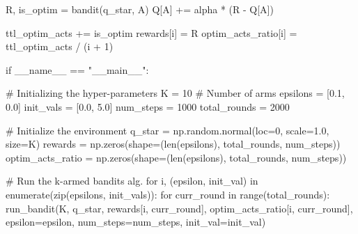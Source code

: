 \documentclass[
  letterpaper,
]{krantz}
\makeatletter
\newenvironment{Shaded}{\begin{snugshade}}{\end{snugshade}}
\newcommand{\BuiltInTok}[1]{\textcolor[rgb]{0.00,0.23,0.31}{#1}}
\newcommand{\CommentTok}[1]{\textcolor[rgb]{0.37,0.37,0.37}{#1}}
\newcommand{\ControlFlowTok}[1]{\textcolor[rgb]{0.00,0.23,0.31}{#1}}
\newcommand{\DecValTok}[1]{\textcolor[rgb]{0.68,0.00,0.00}{#1}}
\newcommand{\FloatTok}[1]{\textcolor[rgb]{0.68,0.00,0.00}{#1}}
\newcommand{\KeywordTok}[1]{\textcolor[rgb]{0.00,0.23,0.31}{#1}}
\newcommand{\NormalTok}[1]{\textcolor[rgb]{0.00,0.23,0.31}{#1}}
\newcommand{\OperatorTok}[1]{\textcolor[rgb]{0.37,0.37,0.37}{#1}}
\newcommand{\StringTok}[1]{\textcolor[rgb]{0.13,0.47,0.30}{#1}}
\newcommand{\VariableTok}[1]{\textcolor[rgb]{0.07,0.07,0.07}{#1}}
\newenvironment{kframe}{%
\medskip{}
\setlength{\fboxsep}{.8em}
 \def\at@end@of@kframe{}%
 \ifinner\ifhmode%
  \def\at@end@of@kframe{\end{minipage}}%
  \begin{minipage}{\columnwidth}%
 \fi\fi%
 \def\FrameCommand##1{\hskip\@totalleftmargin \hskip-\fboxsep
 \colorbox{shadecolor}{##1}\hskip-\fboxsep
     \hskip-\linewidth \hskip-\@totalleftmargin \hskip\columnwidth}%
 \MakeFramed {\advance\hsize-\width
   \@totalleftmargin\z@ \linewidth\hsize
   \@setminipage}}%
 {\par\unskip\endMakeFramed%
 \at@end@of@kframe}
\renewenvironment{Shaded}{\begin{kframe}}{\end{kframe}}
\theoremstyle{plain}
\theoremstyle{definition}
\theoremstyle{definition}
\theoremstyle{remark}
\makeatother
\begin{document}
\begin{codelisting}
\begin{Shaded}
\begin{Highlighting}[]
\NormalTok{        R, is\_optim }\OperatorTok{=}\NormalTok{ bandit(q\_star, A)}
\NormalTok{        Q[A] }\OperatorTok{+=}\NormalTok{ alpha }\OperatorTok{*}\NormalTok{ (R }\OperatorTok{{-}}\NormalTok{ Q[A])}

\NormalTok{        ttl\_optim\_acts }\OperatorTok{+=}\NormalTok{ is\_optim}
\NormalTok{        rewards[i] }\OperatorTok{=}\NormalTok{ R}
\NormalTok{        optim\_acts\_ratio[i] }\OperatorTok{=}\NormalTok{ ttl\_optim\_acts }\OperatorTok{/}\NormalTok{ (i }\OperatorTok{+} \DecValTok{1}\NormalTok{)}


\ControlFlowTok{if} \VariableTok{\_\_name\_\_} \OperatorTok{==} \StringTok{"\_\_main\_\_"}\NormalTok{:}

    \CommentTok{\# Initializing the hyper{-}parameters}
\NormalTok{    K }\OperatorTok{=} \DecValTok{10} \CommentTok{\# Number of arms}
\NormalTok{    epsilons }\OperatorTok{=}\NormalTok{ [}\FloatTok{0.1}\NormalTok{, }\FloatTok{0.0}\NormalTok{]}
\NormalTok{    init\_vals }\OperatorTok{=}\NormalTok{ [}\FloatTok{0.0}\NormalTok{, }\FloatTok{5.0}\NormalTok{]}
\NormalTok{    num\_steps }\OperatorTok{=} \DecValTok{1000}
\NormalTok{    total\_rounds }\OperatorTok{=} \DecValTok{2000}

    \CommentTok{\# Initialize the environment}
\NormalTok{    q\_star }\OperatorTok{=}\NormalTok{ np.random.normal(loc}\OperatorTok{=}\DecValTok{0}\NormalTok{, scale}\OperatorTok{=}\FloatTok{1.0}\NormalTok{, size}\OperatorTok{=}\NormalTok{K)}
\NormalTok{    rewards }\OperatorTok{=}\NormalTok{ np.zeros(shape}\OperatorTok{=}\NormalTok{(}\BuiltInTok{len}\NormalTok{(epsilons), total\_rounds, num\_steps))}
\NormalTok{    optim\_acts\_ratio }\OperatorTok{=}\NormalTok{ np.zeros(shape}\OperatorTok{=}\NormalTok{(}\BuiltInTok{len}\NormalTok{(epsilons), total\_rounds, num\_steps))}
    
    \CommentTok{\# Run the k{-}armed bandits alg.}
    \ControlFlowTok{for}\NormalTok{ i, (epsilon, init\_val) }\KeywordTok{in} \BuiltInTok{enumerate}\NormalTok{(}\BuiltInTok{zip}\NormalTok{(epsilons, init\_vals)):}
        \ControlFlowTok{for}\NormalTok{ curr\_round }\KeywordTok{in} \BuiltInTok{range}\NormalTok{(total\_rounds):}
\NormalTok{            run\_bandit(K, q\_star, }
\NormalTok{                       rewards[i, curr\_round], }
\NormalTok{                       optim\_acts\_ratio[i, curr\_round], }
\NormalTok{                       epsilon}\OperatorTok{=}\NormalTok{epsilon, }
\NormalTok{                       num\_steps}\OperatorTok{=}\NormalTok{num\_steps,}
\NormalTok{                       init\_val}\OperatorTok{=}\NormalTok{init\_val)}
    

\end{Highlighting}
\end{Shaded}
\end{codelisting}
\end{document}
